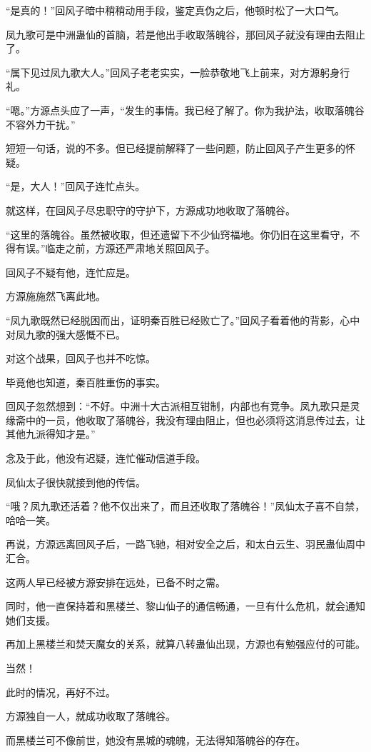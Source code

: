 \begin{this_body}
“是真的！”回风子暗中稍稍动用手段，鉴定真伪之后，他顿时松了一大口气。

凤九歌可是中洲蛊仙的首脑，若是他出手收取落魄谷，那回风子就没有理由去阻止了。

“属下见过凤九歌大人。”回风子老老实实，一脸恭敬地飞上前来，对方源躬身行礼。

“嗯。”方源点头应了一声，“发生的事情。我已经了解了。你为我护法，收取落魄谷不容外力干扰。”

短短一句话，说的不多。但已经提前解释了一些问题，防止回风子产生更多的怀疑。

“是，大人！”回风子连忙点头。

就这样，在回风子尽忠职守的守护下，方源成功地收取了落魄谷。

“这里的落魄谷。虽然被收取，但还遗留下不少仙窍福地。你仍旧在这里看守，不得有误。”临走之前，方源还严肃地关照回风子。

回风子不疑有他，连忙应是。

方源施施然飞离此地。

“凤九歌既然已经脱困而出，证明秦百胜已经败亡了。”回风子看着他的背影，心中对凤九歌的强大感慨不已。

对这个战果，回风子也并不吃惊。

毕竟他也知道，秦百胜重伤的事实。

回风子忽然想到：“不好。中洲十大古派相互钳制，内部也有竞争。凤九歌只是灵缘斋中的一员，他收取了落魄谷，我没有理由阻止，但也必须将这消息传过去，让其他九派得知才是。”

念及于此，他没有迟疑，连忙催动信道手段。

凤仙太子很快就接到他的传信。

“哦？凤九歌还活着？他不仅出来了，而且还收取了落魄谷！”凤仙太子喜不自禁，哈哈一笑。

再说，方源远离回风子后，一路飞驰，相对安全之后，和太白云生、羽民蛊仙周中汇合。

这两人早已经被方源安排在远处，已备不时之需。

同时，他一直保持着和黑楼兰、黎山仙子的通信畅通，一旦有什么危机，就会通知她们支援。

再加上黑楼兰和焚天魔女的关系，就算八转蛊仙出现，方源也有勉强应付的可能。

当然！

此时的情况，再好不过。

方源独自一人，就成功收取了落魄谷。

而黑楼兰可不像前世，她没有黑城的魂魄，无法得知落魄谷的存在。


\end{this_body}
